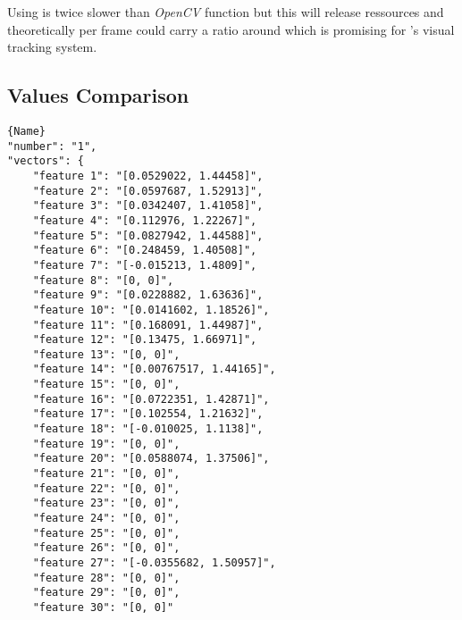 Using \vc{} is twice slower than \emph{OpenCV} function but this will release  ressources and theoretically  per frame could carry a ratio around  which is promising for \iBubble{}'s visual tracking system.


\subsection{Values Comparison}

\noindent\begin{minipage}{.45\textwidth}
\begin{lstlisting}[caption={\code{calcOpticalFlowPyrLK} values},frame=tlrb,basicstyle=\tiny,label=openVal]{Name}
"number": "1",
"vectors": {
	"feature 1": "[0.0529022, 1.44458]",
	"feature 2": "[0.0597687, 1.52913]",
	"feature 3": "[0.0342407, 1.41058]",
	"feature 4": "[0.112976, 1.22267]",
	"feature 5": "[0.0827942, 1.44588]",
	"feature 6": "[0.248459, 1.40508]",
	"feature 7": "[-0.015213, 1.4809]",
	"feature 8": "[0, 0]",
	"feature 9": "[0.0228882, 1.63636]",
	"feature 10": "[0.0141602, 1.18526]",
	"feature 11": "[0.168091, 1.44987]",
	"feature 12": "[0.13475, 1.66971]",
	"feature 13": "[0, 0]",
	"feature 14": "[0.00767517, 1.44165]",
	"feature 15": "[0, 0]",
	"feature 16": "[0.0722351, 1.42871]",
	"feature 17": "[0.102554, 1.21632]",
	"feature 18": "[-0.010025, 1.1138]",
	"feature 19": "[0, 0]",
	"feature 20": "[0.0588074, 1.37506]",
	"feature 21": "[0, 0]",
	"feature 22": "[0, 0]",
	"feature 23": "[0, 0]",
	"feature 24": "[0, 0]",
	"feature 25": "[0, 0]",
	"feature 26": "[0, 0]",
	"feature 27": "[-0.0355682, 1.50957]",
	"feature 28": "[0, 0]",
	"feature 29": "[0, 0]",
	"feature 30": "[0, 0]"
\end{lstlisting}
\end{minipage}\hfill
